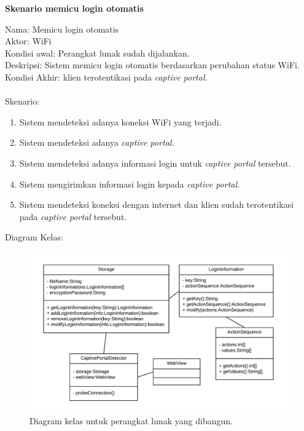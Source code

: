 \documentclass[a4paper,twoside]{article}
\begin{document}
\begin{enumerate}
        \textbf{Skenario memicu login otomatis}
        
        Nama: Memicu login otomatis\\
        Aktor: WiFi\\
        Kondisi awal: Perangkat lunak sudah dijalankan.\\
        Deskripsi: Sistem memicu login otomatis berdasarkan perubahan status WiFi.\\
        Kondisi Akhir: klien terotentikasi pada \textit{captive portal}.\\\\
        Skenario:
        \begin{enumerate}
            \item{Sistem mendeteksi adanya koneksi WiFi yang terjadi.}
            \item{Sistem mendeteksi adanya \textit{captive portal}.}
            \item{Sistem mendeteksi adanya informasi login untuk \textit{captive portal} tersebut.}
            \item{Sistem mengirimkan informasi login kepada \textit{captive portal}.}
            \item{Sistem mendeteksi koneksi dengan internet dan klien sudah terotentikasi pada \textit{captive portal} tersebut.}
        \end{enumerate}
        
        Diagram Kelas:
        
        \begin{figure}[h]
            \centering
            \includegraphics[scale=0.85]{classdiagram.png}
            \caption[Diagram kelas untuk perangkat lunak yang dibangun.]{Diagram kelas untuk perangkat lunak yang dibangun.}
            \label{fig:diagramkelas}
        \end{figure}
        

\end{enumerate}
\end{document}
